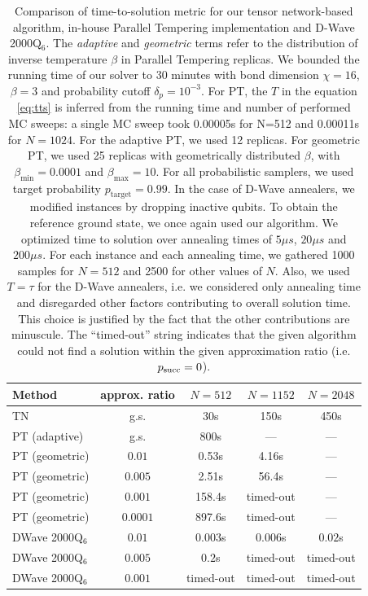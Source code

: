 \begin{table}[b]
  \centering
  \begin{tabular}{|l|c|ccc|}
    \hline
    \rowcolor{theader}  Method & approx. ratio & $N=512$   & $N=1152$  & $N=2048$  \\
    \hline
    TN                         & g.s.          & 30s       & 150s      & 450s      \\
    \hline
    \hline
    PT (adaptive)              & g.s.          & 800s      & ---       & ---       \\
    \hline
    PT (geometric)             & $0.01$        & 0.53s     & 4.16s     & ---       \\
    PT (geometric)             & $0.005$       & 2.51s     & 56.4s     & ---       \\
    PT (geometric)             & $0.001$       & 158.4s    & timed-out & ---       \\
    PT (geometric)             & $0.0001$      & 897.6s    & timed-out & ---       \\
    \hline
    \hline
    DWave 2000Q$_6$            & $0.01$        & $0.003$s  & $0.006$s  & $0.02$s   \\
    DWave 2000Q$_6$            & $0.005$       & $0.2$s    & timed-out & timed-out \\
    DWave 2000Q$_6$            & $0.001$       & timed-out & timed-out & timed-out \\
    \hline
    \hline
  \end{tabular}
  \caption{Comparison of time-to-solution metric for our tensor network-based algorithm,
    in-house Parallel Tempering implementation and D-Wave 2000Q$_{6}$. The
    \emph{adaptive} and \emph{geometric} terms refer to the distribution of inverse
    temperature $\beta$ in Parallel Tempering replicas. We bounded the running time
    of our solver to 30 minutes with bond dimension $\chi = 16$, $\beta=3$ and
    probability cutoff $\delta_{p} = 10^{-3}$. For PT, the $T$ in the equation
    \ref{eq:tts} is inferred from the running time and number of performed MC
    sweeps: a single MC sweep took 0.00005s for N=512 and 0.00011s for $N=1024$.
    For the adaptive PT, we used 12 replicas. For geometric PT, we used 25 replicas
    with geometrically distributed $\beta$, with $\beta_{\min}=0.0001$ and
    $\beta_{\max}=10$. For all probabilistic samplers, we used target probability
    $p_{\mbox{target}}=0.99$. In the case of D-Wave annealers, we modified
    instances by dropping inactive qubits. To obtain the reference ground state, we
    once again used our algorithm. We optimized time to solution over annealing
    times of $5\mu s$, $20\mu s$ and $200\mu s$. For each instance and each
    annealing time, we gathered 1000 samples for $N=512$ and 2500 for other values
    of $N$. Also, we used $T=\tau$ for the D-Wave annealers, i.e. we considered
    only annealing time and disregarded other factors contributing to overall
    solution time. This choice is justified by the fact that the other
    contributions are minuscule. The ``timed-out'' string indicates that the given
    algorithm could not find a solution within the given approximation ratio (i.e.
    $p_{\text{succ}}=0$). } \label{tab:tnvspt}
\end{table}

